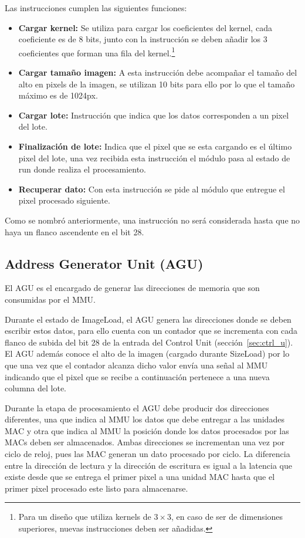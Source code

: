 Las instrucciones cumplen las siguientes funciones:

\begin{itemize}
\item \textbf{Cargar kernel:} Se utiliza para cargar los coeficientes del
  kernel, cada coeficiente es de 8 bits, junto con la instrucción se deben
  añadir los 3 coeficientes que forman una fila del kernel.\footnote{Para un
    diseño que utiliza kernels de $3\times3$, en caso de ser de dimensiones
    superiores, nuevas instrucciones deben ser añadidas.}
\item \textbf{Cargar tamaño imagen:} A esta instrucción debe acompañar el tamaño
  del alto en pixels de la imagen, se utilizan 10 bits para ello por lo que el
  tamaño máximo es de 1024px.
\item \textbf{Cargar lote:} Instrucción que indica que los datos corresponden a
  un pixel del lote.
\item \textbf{Finalización de lote:} Indica que el pixel que se esta cargando es
  el último pixel del lote, una vez recibida esta instrucción el módulo pasa al
  estado de run donde realiza el procesamiento.
\item \textbf{Recuperar dato:} Con esta instrucción se pide al módulo que
  entregue el pixel procesado siguiente.
\end{itemize}

Como se nombró anteriormente, una instrucción no será considerada hasta que no
haya un flanco ascendente en el bit 28.

\subsection{Address Generator Unit (AGU)}

El AGU es el encargado de generar las direcciones de memoria que son
consumidas por el MMU.

Durante el estado de ImageLoad, el AGU genera las direcciones donde se deben
escribir estos datos, para ello cuenta con un contador que se incrementa con
cada flanco de subida del bit 28 de la entrada del Control Unit
(sección~\ref{sec:ctrl_u}). El AGU además conoce el alto de la imagen (cargado
durante SizeLoad) por lo que una vez que el contador alcanza dicho valor envía
una señal al MMU indicando que el pixel que se recibe a continuación pertenece a
una nueva columna del lote.

Durante la etapa de procesamiento el AGU debe producir dos direcciones
diferentes, una que indica al MMU los datos que debe entregar a las unidades MAC
y otra que indica al MMU la posición donde los datos procesados por las MACs
deben ser almacenados. Ambas direcciones se incrementan una vez por ciclo de
reloj, pues las MAC generan un dato procesado por ciclo. La diferencia entre la
dirección de lectura y la dirección de escritura es igual a la latencia que
existe desde que se entrega el primer pixel a una unidad MAC hasta que el primer
pixel procesado este listo para almacenarse.

